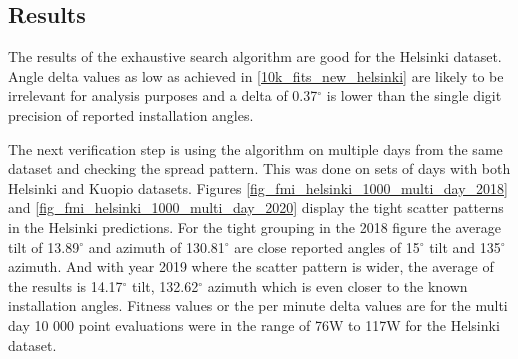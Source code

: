 

\newpage
\subsection{Results}
The results of the exhaustive search algorithm are good for the Helsinki dataset. Angle delta values as low as achieved in \ref{10k_fits_new_helsinki} are likely to be irrelevant for analysis purposes and a delta of 0.37$^\circ$ is lower than the single digit precision of reported installation angles.

The next verification step is using the algorithm on multiple days from the same dataset and checking the spread pattern. This was done on sets of days with both Helsinki and Kuopio datasets. Figures \ref{fig_fmi_helsinki_1000_multi_day_2018} and \ref{fig_fmi_helsinki_1000_multi_day_2020} display the tight scatter patterns in the Helsinki predictions. For the tight grouping in the 2018 figure the average tilt of 13.89$^\circ$ and azimuth of 130.81$^\circ$ are close reported angles of 15$^\circ$ tilt and 135$^\circ$ azimuth. And with year 2019 where the scatter pattern is wider, the average of the results is 14.17$^\circ$ tilt, 132.62$^\circ$ azimuth which is even closer to the known installation angles. Fitness values or the per minute delta values are for the multi day 10 000 point evaluations were in the range of 76W to 117W for the Helsinki dataset.







